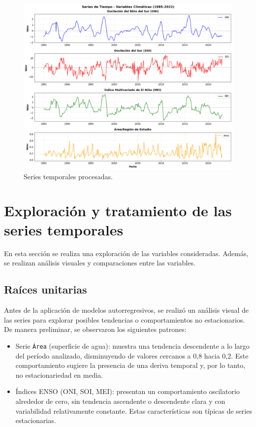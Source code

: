 \begin{figure}[ht]
        \centering
        \includegraphics[scale=.32]
        {Figures/ts_final.png}
        \caption{Series temporales procesadas.}
        \label{fig:ts_final}
\end{figure}
 
\newpage 
\section{Exploración y tratamiento de las series temporales}
En esta sección se realiza una exploración de las variables consideradas. Además, se realizan análisis visuales y comparaciones entre las variables. 

\subsection{Raíces unitarias}

Antes de la aplicación de modelos autorregresivos, se realizó un análisis visual de las 
series para explorar posibles tendencias o comportamientos no estacionarios. De manera 
preliminar, se observaron los siguientes patrones:

\begin{itemize}
    \item Serie \texttt{Área} (superficie de agua): muestra una tendencia descendente a lo 
    largo del período analizado, disminuyendo de valores cercanos a 0,8 hacia 0,2. Este 
    comportamiento sugiere la presencia de una deriva temporal y, por lo tanto, 
    no estacionariedad en media.
    \item Índices ENSO (ONI, SOI, MEI): presentan un comportamiento oscilatorio 
    alrededor de cero, sin tendencia ascendente o descendente clara y con variabilidad 
    relativamente constante. Estas características son típicas de series estacionarias.
\end{itemize}

